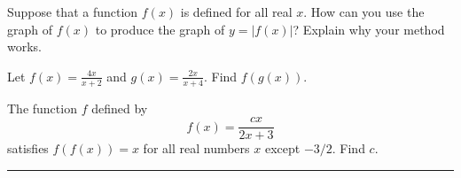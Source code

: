 \documentclass[11pt]{article}
\begin{document}
\begin{questions}
\newpage

\item Suppose that a function $f(x)$ is defined for all real $x$. How can you use the
  graph of $f(x)$ to produce the graph of $y = |f(x)|$? Explain why your method works.
  \work

\item Let $\displaystyle f(x) = \frac{4x}{x+2}$ and $\displaystyle g(x) = \frac{2x}{x+4}$.
  Find $f(g(x))$.
  \work

\item The function $f$ defined by
  \[ f(x) = \frac{cx}{2x+3} \]
  satisfies $f(f(x)) = x$ for all real numbers $x$ except $-3/2$. Find $c$.
  \work

\end{questions}

\noindent\textcolor{rule}{\rule{\linewidth}{0.4pt}}\\[2pt]
\end{document}
